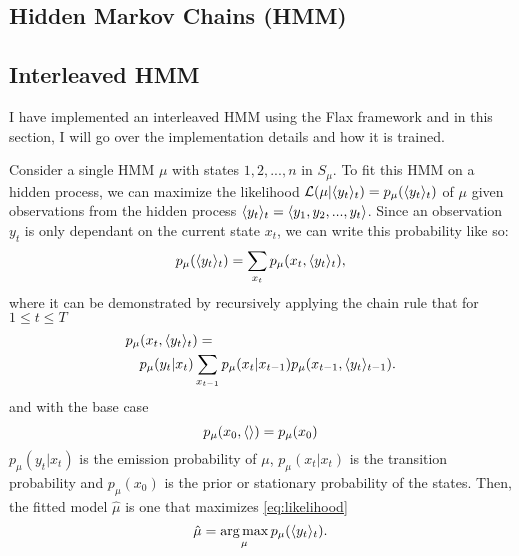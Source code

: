 \subsection{Hidden Markov Chains (HMM)}

\subsection{Interleaved HMM}

I have implemented an interleaved HMM using the Flax\cite{Heek2023-nl} framework and in this section, I will go over the implementation details and how it is trained.

Consider a single HMM \(\mu\) with states \(1, 2, ...,n\) in \(S_\mu\). To fit this HMM on a hidden process, we can maximize the likelihood \(\mathcal{L}(\mu | \langle y_t\rangle_t) = p_\mu(\langle y_t\rangle_t)\) of \(\mu\) given observations from the hidden process \(\langle y_t\rangle_t = \langle y_1, y_2, ..., y_t\rangle\). Since an observation \(y_t\) is only dependant on the current state \(x_t\), we can write this probability like so:
\begin{equation}\label{eq:likelihood}
    p_\mu(\langle y_t\rangle_t) = \sum_{x_t} p_\mu(x_t, \langle y_t\rangle_t),
\end{equation}
where it can be demonstrated by recursively applying the chain rule that for \(1
\leq t \leq T\)
\begin{equation}
    \begin{multlined}
        p_\mu(x_t, \seq{y_t}_t) = \\
        p_\mu(y_t|x_t) \sum_{x_{t-1}} p_\mu(x_t|x_{t-1}) p_\mu(x_{t-1}, \seq{y_t}_{t-1}).
    \end{multlined}
\end{equation}
and with the base case
\begin{equation}\label{eq:max_likelihood}
    p_\mu(x_0, \langle\rangle) = p_\mu(x_0)
\end{equation}
\(p_\mu(y_t|x_t)\) is the emission probability of \(\mu\), \(p_\mu(x_t | x_t)\) is the transition probability and \(p_\mu(x_0)\) is the prior or stationary probability of the states. Then, the fitted model \(\hat{\mu}\) is one that maximizes \cref{eq:likelihood}
\begin{equation}
    \label{eq:argmax_observation}
    \hat{\mu} = \operatorname*{arg\,max}_{\mu} p_\mu(\langle y_t\rangle_t).
\end{equation}

